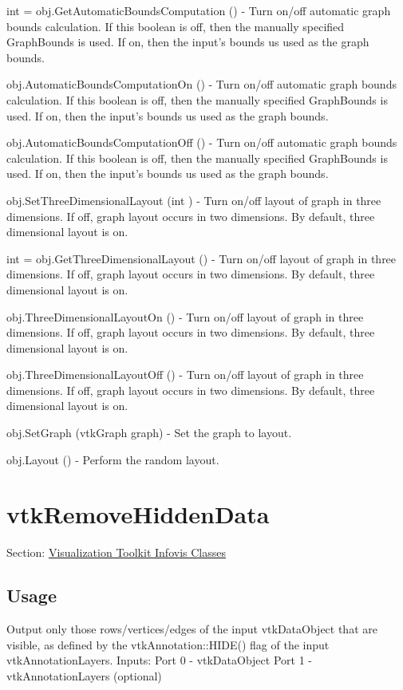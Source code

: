 \begin{DoxyItemize}
\item {\ttfamily int = obj.\-Get\-Automatic\-Bounds\-Computation ()} -\/ Turn on/off automatic graph bounds calculation. If this boolean is off, then the manually specified Graph\-Bounds is used. If on, then the input's bounds us used as the graph bounds.  
\item {\ttfamily obj.\-Automatic\-Bounds\-Computation\-On ()} -\/ Turn on/off automatic graph bounds calculation. If this boolean is off, then the manually specified Graph\-Bounds is used. If on, then the input's bounds us used as the graph bounds.  
\item {\ttfamily obj.\-Automatic\-Bounds\-Computation\-Off ()} -\/ Turn on/off automatic graph bounds calculation. If this boolean is off, then the manually specified Graph\-Bounds is used. If on, then the input's bounds us used as the graph bounds.  
\item {\ttfamily obj.\-Set\-Three\-Dimensional\-Layout (int )} -\/ Turn on/off layout of graph in three dimensions. If off, graph layout occurs in two dimensions. By default, three dimensional layout is on.  
\item {\ttfamily int = obj.\-Get\-Three\-Dimensional\-Layout ()} -\/ Turn on/off layout of graph in three dimensions. If off, graph layout occurs in two dimensions. By default, three dimensional layout is on.  
\item {\ttfamily obj.\-Three\-Dimensional\-Layout\-On ()} -\/ Turn on/off layout of graph in three dimensions. If off, graph layout occurs in two dimensions. By default, three dimensional layout is on.  
\item {\ttfamily obj.\-Three\-Dimensional\-Layout\-Off ()} -\/ Turn on/off layout of graph in three dimensions. If off, graph layout occurs in two dimensions. By default, three dimensional layout is on.  
\item {\ttfamily obj.\-Set\-Graph (vtk\-Graph graph)} -\/ Set the graph to layout.  
\item {\ttfamily obj.\-Layout ()} -\/ Perform the random layout.  
\end{DoxyItemize}\hypertarget{vtkinfovis_vtkremovehiddendata}{}\section{vtk\-Remove\-Hidden\-Data}\label{vtkinfovis_vtkremovehiddendata}
Section\-: \hyperlink{sec_vtkinfovis}{Visualization Toolkit Infovis Classes} \hypertarget{vtkwidgets_vtkxyplotwidget_Usage}{}\subsection{Usage}\label{vtkwidgets_vtkxyplotwidget_Usage}
Output only those rows/vertices/edges of the input vtk\-Data\-Object that are visible, as defined by the vtk\-Annotation\-::\-H\-I\-D\-E() flag of the input vtk\-Annotation\-Layers. Inputs\-: Port 0 -\/ vtk\-Data\-Object Port 1 -\/ vtk\-Annotation\-Layers (optional)

